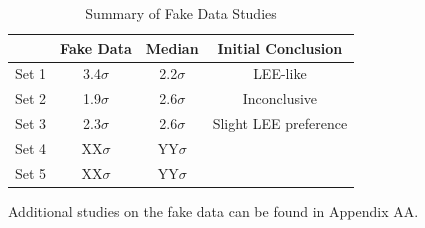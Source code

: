 \begin{table}[h!]
\centering
\begin{center}
\begin{tabular}{ c|c|c|c } 
 & Fake Data & Median & Initial Conclusion \\ 
\hline \hline
 Set 1 & 3.4$\sigma$ & 2.2$\sigma$ & LEE-like \\ 
 Set 2 & 1.9$\sigma$ & 2.6$\sigma$ & Inconclusive \\ 
 Set 3 & 2.3$\sigma$ & 2.6$\sigma$ & Slight LEE preference \\ 
 Set 4 & XX$\sigma$ & YY$\sigma$ &  \\ 
 Set 5 & XX$\sigma$ & YY$\sigma$ &  \\ 
 \hline \hline
\end{tabular}
\end{center}
\caption{Summary of Fake Data Studies}
\label{tab:fakedata:summary}
\end{table}

Additional studies on the fake data can be found in Appendix AA. 

